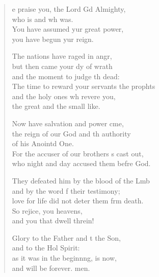 \settowidth{\versewidth}{The time to reward your servants the prophets +}
\begin{verse}%
  \begin{patverse}
e praise you, the Lord Gd Almighty,\Med\\
who is and wh was.\\
You have assumed yur great power,\Med\\
you have begun yur reign.

The nations have raged in angr,\Flex\\
but then came your dy of wrath\Med\\
and the moment to judge th dead:\\
The time to reward your servants the prophts\Flex\\
and the holy ones wh revere you,\Med\\
the great and the small like.

Now have salvation and power cme,\Flex\\
the reign of our God and th authority\Med\\
of his Anointd One.\\
For the accuser of our brothers \pointup{\i}s cast out,\Med\\
who night and day accused them befre God.

They defeated him by the blood of the Lmb\Flex\\
and by the word f their testimony;\Med\\
love for life did not deter them frm death.\\
So rejice, you heavens,\Med\\
and you that dwell threin!

Glory to the Father and t the Son,\Med\\
and to the Hol Spirit:\\
as it was in the beginn\pointup{\i}ng, is now,\Med\\
and will be forever. men. 
  \end{patverse}
\end{verse}
